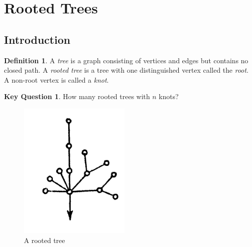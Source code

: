 \documentclass{article}
\theoremstyle{definition}
\newtheorem{definition}{Definition}[section]
\theoremstyle{question}
\newtheorem{question}{Key Question}[section]
\begin{document}
\newpage
    \section{Rooted Trees}
    \subsection{Introduction}
    \begin{definition}
                    A \emph{tree} is a graph consisting of vertices and edges 
            but contains no closed path. A \emph{rooted tree} is a tree with one distinguished vertex called the \emph{root}. A non-root vertex is called a \emph{knot}.
    \end{definition}

\begin{question}
    How many rooted trees with $n$ knots?
\end{question}
        \begin{figure}[h]
            \centering
            \includegraphics[scale=0.5]{images/rooted-tree.png}
            \caption{A rooted tree}
            \label{fig:enter-label}
        \end{figure}
\end{document}

